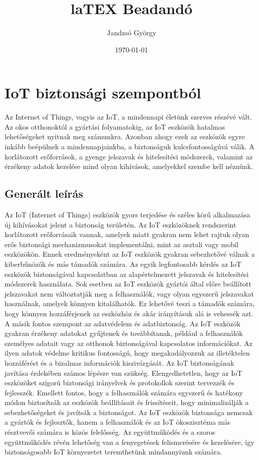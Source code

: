 \documentclass{report}
\title{laTEX Beadandó}
\author{Jandzsó György}
\date{\today}
\begin{document}
	\maketitle
	
	\tableofcontents
	\listoffigures
	\listoftables


	\chapter{IoT biztonsági szempontból}
		Az Internet of Things, vagyis az IoT, a mindennapi életünk szerves részévé vált. Az okos otthonoktól a gyártási folyamatokig, az IoT eszközök hatalmas lehetőségeket nyitnak meg számunkra. Azonban ahogy ezek az eszközök egyre inkább beépülnek a mindennapjainkba, a biztonságuk kulcsfontosságúvá válik. A korlátozott erőforrások, a gyenge jelszavak és hitelesítési módszerek, valamint az érzékeny adatok kezelése mind olyan kihívások, amelyekkel szembe kell néznünk. 

		\section{Generált leírás}
			Az IoT (Internet of Things) eszközök gyors terjedése és széles körű alkalmazása új kihívásokat jelent a biztonság területén. Az IoT eszközöknek rendszerint korlátozott erőforrásaik vannak, amelyek miatt gyakran nem lehet rajtuk olyan erős biztonsági mechanizmusokat implementálni, mint az asztali vagy mobil eszközökön. Ennek eredményeként az IoT eszközök gyakran sebezhetővé válnak a kiberbűnözők és más támadók számára.
			Az egyik legfontosabb kérdés az IoT eszközök biztonságával kapcsolatban az alapértelmezett jelszavak és hitelesítési módszerek használata. Sok esetben az IoT eszközök gyártói által előre beállított jelszavakat nem változtatják meg a felhasználók, vagy olyan egyszerű jelszavakat használnak, amelyek könnyen kitalálhatók. Ez lehetővé teszi a támadók számára, hogy könnyen hozzáférjenek az eszközhöz és akár irányításuk alá is vehessék azt.
			A másik fontos szempont az adatvédelem és adatbiztonság. Az IoT eszközök gyakran érzékeny adatokat gyűjtenek és továbbítanak, például a felhasználók személyes adatait vagy az otthonok biztonságával kapcsolatos információkat. Az ilyen adatok védelme kritikus fontosságú, hogy megakadályozzuk az illetéktelen hozzáférést és a bizalmas információk kiszivárgását.
			Az IoT biztonságának javítása érdekében számos lépésre van szükség. Elengedhetetlen, hogy az IoT eszközöket szigorú biztonsági irányelvek és protokollok szerint tervezzék és fejlesszék. Emellett fontos, hogy a felhasználók számára egyszerű és hatékony módon biztosítsák az eszközök beállításait és frissítéseit, hogy minimalizálják a sebezhetőségeket és javítsák a biztonságot.
			Az IoT eszközök biztonsága nemcsak a gyártók és fejlesztők, hanem a felhasználók és az IoT ökoszisztéma más résztvevői számára is közös felelősség. Az együttműködés és a szoros együttműködés révén lehetőség van a fenyegetések felismerésére és kezelésére, így biztonságosabb IoT környezetet teremthetünk mindannyiunk számára.
			
\end{document}
